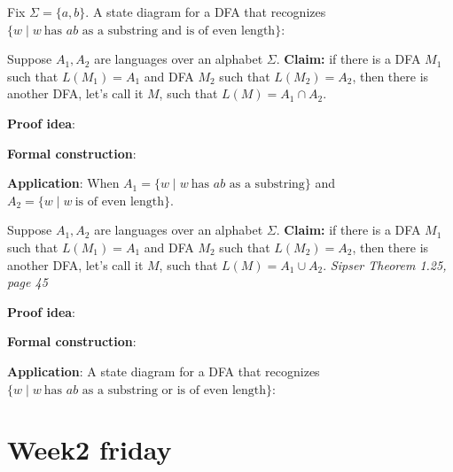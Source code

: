 \documentclass[12pt, oneside]{article}
\begin{document}
Fix  $\Sigma = \{a,b\}$. A state diagram for a DFA that recognizes 
$\{w \mid w~\text{has $ab$ as a substring and is of even length} \}$:


\vspace{120pt}


Suppose $A_1, A_2$ are languages over an alphabet $\Sigma$.
{\bf Claim:} if there is a DFA $M_1$ such that $L(M_1) = A_1$ and 
DFA $M_2$ such that $L(M_2) = A_2$, then there is another DFA, let's call it $M$, such that 
$L(M) = A_1 \cap A_2$.

{\bf Proof idea}:


{\bf Formal construction}: 


\vspace{70pt}

{\bf Application}:  When $A_1 = \{w \mid w~\text{has $ab$ as a substring} \}$ and 
$A_2 = \{ w \mid w~\text{is of even length} \}$.


\newpage

Suppose $A_1, A_2$ are languages over an alphabet $\Sigma$.
{\bf Claim:} if there is a DFA $M_1$ such that $L(M_1) = A_1$ and 
DFA $M_2$ such that $L(M_2) = A_2$, then there is another DFA, let's call it $M$, such that 
$L(M) = A_1 \cup A_2$.  {\it Sipser Theorem 1.25, page 45}

{\bf Proof idea}:


{\bf Formal construction}: 

\vspace{70pt}

{\bf Application}: A state diagram for a DFA that recognizes $\{w \mid w~\text{has $ab$ as a substring or is of even length} \}$:

\vspace{100pt}
 \vfill
\section*{Week2 friday}
\end{document}
